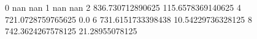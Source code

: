 0 nan nan
1 nan nan
2 836.730712890625 115.6578369140625
4 721.0728759765625 0.0
6 731.6151733398438 10.54229736328125
8 742.3624267578125 21.28955078125
